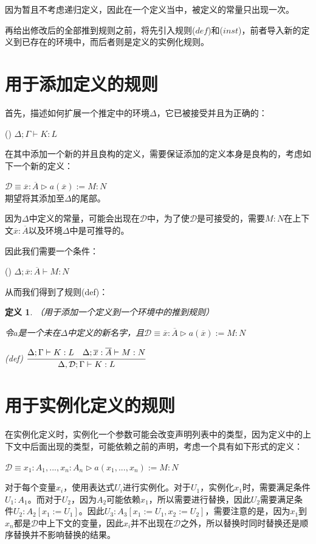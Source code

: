 \documentclass[UTF8]{article}
\newtheorem{thm}{定义}[section]
\newcommand{\rmnum}[1]{\romannumeral #1}
\begin{document}
		因为暂且不考虑递归定义，因此在一个定义当中，被定义的常量只出现一次。
		
		再给出修改后的全部推到规则之前，将先引入规则($def$)和($inst$)，前者导入新的定义到已存在的环境中，而后者则是定义的实例化规则。
		
	\section{用于添加定义的规则}
	\noindent
	首先，描述如何扩展一个推定中的环境$\Delta$，它已被接受并且为正确的：
	
		(\rmnum{1}) $\Delta;\Gamma\vdash K:L$
		
		在其中添加一个新的并且良构的定义，需要保证添加的定义本身是良构的，考虑如下一个新的定义：
		
		$\mathcal{D}\equiv\overline{x}:\overline{A}\triangleright a(\overline{x}):=M:N$\\
		期望将其添加至$\Delta$的尾部。
		
		因为$\Delta$中定义的常量，可能会出现在$\mathcal{D}$中，为了使$\mathcal{D}$是可接受的，需要$M:N$在上下文$\overline{x}:\overline{A}$以及环境$\Delta$中是可推导的。
		
		因此我们需要一个条件：
		
		(\rmnum{2}) $\Delta;\overline{x}:\overline{A}\vdash M:N$
		
		从而我们得到了规则(def)：
		
		\begin{thm}（用于添加一个定义到一个环境中的推到规则）
			
			\noindent
			令$a$是一个未在$\Delta$中定义的新名字，且$\mathcal{D}\equiv\overline{x}:\overline{A}\triangleright a(\overline{x}):=M:N$
			
			(def) $\cfrac{\Delta;\Gamma\vdash K:L\ \ \ \Delta;\overline{x}:\overline{A}\vdash M:N}{\Delta,\mathcal{D};\Gamma\vdash K:L}$
		\end{thm}

	\section{用于实例化定义的规则}
	\noindent
	在实例化定义时，实例化一个参数可能会改变声明列表中的类型，因为定义中的上下文中后面出现的类型，可能依赖之前的声明，考虑一个具有如下形式的定义：
	
		$\mathcal{D}\equiv x_1:A_1,...,x_n:A_n\triangleright a(x_1,...,x_n):=M:N$
		
		对于每个变量$x_i$，使用表达式$U_i$进行实例化。对于$U_1$，实例化$x_1$时，需要满足条件$U_1:A_1$。而对于$U_2$，因为$A_2$可能依赖$x_1$，所以需要进行替换，因此$U_2$需要满足条件$U_2:A_2\left[x_1:=U_1\right]$。因此$U_3:A_3\left[x_1:=U_1,x_2:=U_2\right]$，需要注意的是，因为$x_1$到$x_n$都是$\mathcal{D}$中上下文的变量，因此$x_i$并不出现在$\mathcal{D}$之外，所以替换时同时替换还是顺序替换并不影响替换的结果。
		
\end{document}
